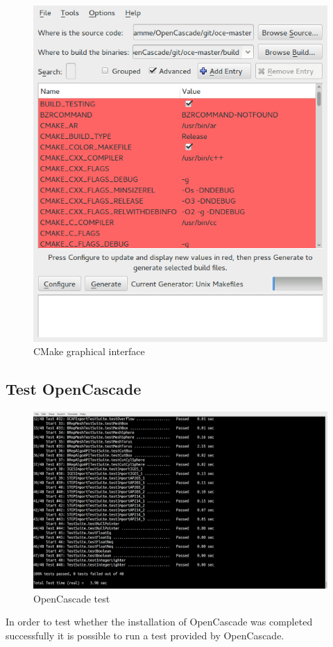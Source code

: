\documentclass[
12pt, %
a4paper, %
oneside, %
headinclude,footinclude, %
BCOR5mm, %
]{scrartcl}
\begin{document}
\begin{figure}
\centering
\includegraphics[scale=0.5]{img/CMake_GUI.png}
\caption{CMake graphical interface}
\label{fig:CMake_GUI}
\end{figure}
\subsection{Test OpenCascade}
\begin{figure}
\centering
\includegraphics[scale=0.2]{img/OC_Test2.png}
\caption{OpenCascade test}
\label{fig:OC_test}
\end{figure}
In order to test whether the installation of OpenCascade was completed successfully it is possible to run a test provided by OpenCascade. 
\end{document}

